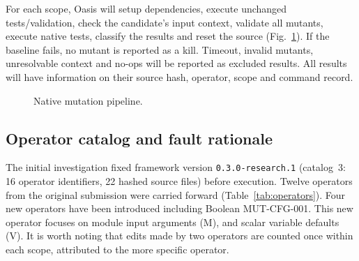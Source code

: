 \documentclass[3p,times,procedia]{elsarticle}
\newcommand{\code}[1]{\texttt{#1}}
\begin{document}
For each scope, Oasis will setup dependencies, execute unchanged tests/validation, check the candidate's
input context, validate all mutants, execute native tests, classify the results and reset the source (Fig.~\ref{fig:pipeline}). If the baseline fails, no mutant is reported as a kill. Timeout, invalid mutants, unresolvable context and no-ops will be reported as excluded results. All results will have information on their source hash, operator, scope and command record.

\begin{figure}[ht]
\centering
{}
\caption{Native mutation pipeline.}\label{fig:pipeline}
\end{figure}

\subsection{Operator catalog and fault rationale}\label{sec:operators}
The initial investigation fixed framework version \code{0.3.0-research.1} (catalog~3: 16 operator identifiers, 22 hashed source files) before execution. Twelve operators from the original submission were carried forward (Table~\ref{tab:operators}). Four new operators have been introduced including Boolean MUT-CFG-001. This new operator focuses on module input arguments (M), and scalar variable defaults (V). It is worth noting that edits made by two operators are counted once within each scope, attributed to the more specific operator.
\end{document}
